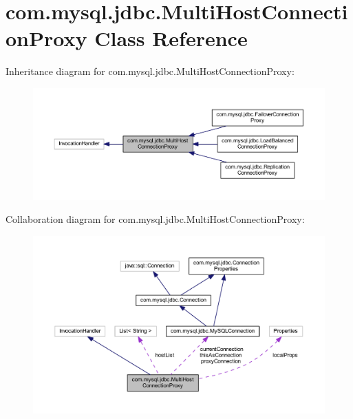 \hypertarget{classcom_1_1mysql_1_1jdbc_1_1_multi_host_connection_proxy}{}\section{com.\+mysql.\+jdbc.\+Multi\+Host\+Connection\+Proxy Class Reference}
\label{classcom_1_1mysql_1_1jdbc_1_1_multi_host_connection_proxy}


Inheritance diagram for com.\+mysql.\+jdbc.\+Multi\+Host\+Connection\+Proxy\+:
\nopagebreak
\begin{figure}[H]
\begin{center}
\leavevmode
\includegraphics[width=350pt]{classcom_1_1mysql_1_1jdbc_1_1_multi_host_connection_proxy__inherit__graph}
\end{center}
\end{figure}


Collaboration diagram for com.\+mysql.\+jdbc.\+Multi\+Host\+Connection\+Proxy\+:
\nopagebreak
\begin{figure}[H]
\begin{center}
\leavevmode
\includegraphics[width=350pt]{classcom_1_1mysql_1_1jdbc_1_1_multi_host_connection_proxy__coll__graph}
\end{center}
\end{figure}
